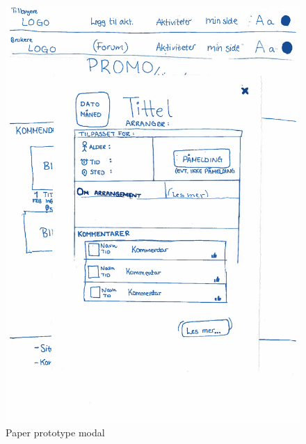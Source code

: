 \begin{figure}[H] 
\centering
\begin{minipage}{.3\textwidth}
  \centering
\includegraphics[scale=0.2]{fig/PaperPrototype/One_activity.pdf}
\caption{Paper prototype modal}
\label{fig:paper_modal}
\end{minipage}%
\begin{minipage}{.7\textwidth}
\centering

\end{minipage}
\end{figure}

